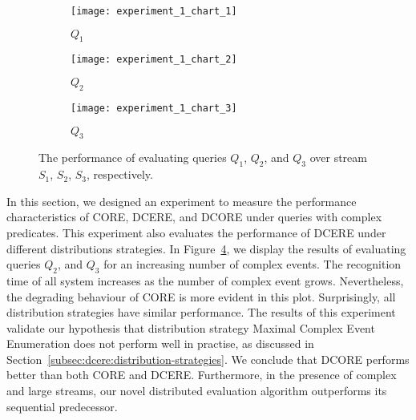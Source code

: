 \begin{figure}[t]
     \begin{adjustbox}{max width=1.3\linewidth,center}
     \centering
     \begin{subfigure}[b]{0.7\textwidth}
         \centering
         \texttt{[image: experiment\_1\_chart\_1]}
         \caption{$Q_{1}$}
         \label{fig:experiment:1:subfigure:1}
     \end{subfigure}
     \begin{subfigure}[b]{0.7\textwidth}
         \centering
         \texttt{[image: experiment\_1\_chart\_2]}
         \caption{$Q_{2}$}
         \label{fig:experiment:1:subfigure:2}
     \end{subfigure}
     \end{adjustbox}
     \begin{center}
      \begin{subfigure}[b]{0.7\textwidth}
          \centering
          \texttt{[image: experiment\_1\_chart\_3]}
          \caption{$Q_{3}$}
          \label{fig:experiment:1:subfigure:3}
      \end{subfigure}
     \end{center}
     \caption{The performance of evaluating queries $Q_{1}$, $Q_{2}$, and $Q_{3}$ over stream $S_{1}$, $S_{2}$, $S_{3}$, respectively.}
     \label{fig:experiment:1}
\end{figure}

In this section, we designed an experiment to measure the performance characteristics of CORE, DCERE, and DCORE under queries with complex predicates. This experiment also evaluates the performance of DCERE under different distributions strategies. In Figure~\ref{fig:experiment:1}, we display the results of evaluating queries $Q_{2}$, and $Q_{3}$ for an increasing number of complex events. The recognition time of all system increases as the number of complex event grows. Nevertheless, the degrading behaviour of CORE is more evident in this plot. Surprisingly, all distribution strategies have similar performance. The results of this experiment validate our hypothesis that distribution strategy Maximal Complex Event Enumeration does not perform well in practise, as discussed in Section~\ref{subsec:dcere:distribution-strategies}. We conclude that DCORE performs better than both CORE and DCERE. Furthermore, in the presence of complex and large streams, our novel distributed evaluation algorithm outperforms its sequential predecessor.

